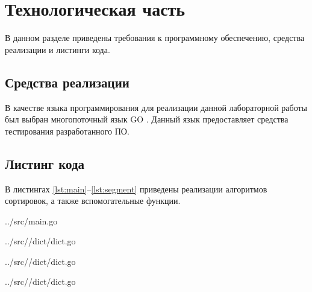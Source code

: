 \chapter{Технологическая часть}

В данном разделе приведены требования к программному обеспечению, средства реализации и листинги кода.

\section{Средства реализации}

В качестве языка программирования для реализации данной лабораторной работы был выбран многопоточный язык GO \cite{golang}. Данный язык предоставляет средства тестирования разработанного ПО.

\section{Листинг кода}

В листингах \ref{lst:main}--\ref{lst:segment} приведены реализации алгоритмов сортировок, а также вспомогательные функции.


\captionsetup{singlelinecheck = false, justification=raggedright}

\begin{lstinputlisting}[
	caption={Основной модуль программы},
	label={lst:main},
	style={go},
	linerange={14-36},
	]{../src/main.go}
\end{lstinputlisting}
\clearpage

\begin{lstinputlisting}[
	caption={Алгоритм полного перебора},
	label={lst:brute},
	style={go},
	linerange={55-64},
	]{../src//dict/dict.go}
\end{lstinputlisting}

\begin{lstinputlisting}[
	caption={Алгоритм двоичного поиска},
	label={lst:binary},
	style={go},
	linerange={66-91},
	]{../src//dict/dict.go}
\end{lstinputlisting}

\clearpage

\begin{lstinputlisting}[
	caption={Алгоритм частотного анализа},
	label={lst:segment},
	style={go},
	linerange={93-136},
	]{../src//dict/dict.go}
\end{lstinputlisting}

\clearpage



